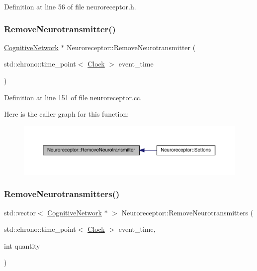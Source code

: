 Definition at line 56 of file neuroreceptor.\+h.

\mbox{\label{class_neuroreceptor_a7e94ac827de7abbac585639edfd4f985}} 
\subsubsection{\texorpdfstring{Remove\+Neurotransmitter()}{RemoveNeurotransmitter()}}
{\footnotesize\ttfamily \hyperlink{class_cognitive_network}{Cognitive\+Network} $\ast$ Neuroreceptor\+::\+Remove\+Neurotransmitter (\begin{DoxyParamCaption}\item[{std\+::chrono\+::time\+\_\+point$<$ \hyperlink{universe_8h_a0ef8d951d1ca5ab3cfaf7ab4c7a6fd80}{Clock} $>$}]{event\+\_\+time }\end{DoxyParamCaption})}



Definition at line 151 of file neuroreceptor.\+cc.

Here is the caller graph for this function\+:\nopagebreak
\begin{figure}[H]
\begin{center}
\leavevmode
\includegraphics[width=350pt]{class_neuroreceptor_a7e94ac827de7abbac585639edfd4f985_icgraph}
\end{center}
\end{figure}
\mbox{\label{class_neuroreceptor_ad760106ce6194ac02959c1882bd0f327}} 
\subsubsection{\texorpdfstring{Remove\+Neurotransmitters()}{RemoveNeurotransmitters()}}
{\footnotesize\ttfamily std\+::vector$<$ \hyperlink{class_cognitive_network}{Cognitive\+Network} $\ast$ $>$ Neuroreceptor\+::\+Remove\+Neurotransmitters (\begin{DoxyParamCaption}\item[{std\+::chrono\+::time\+\_\+point$<$ \hyperlink{universe_8h_a0ef8d951d1ca5ab3cfaf7ab4c7a6fd80}{Clock} $>$}]{event\+\_\+time,  }\item[{int}]{quantity }\end{DoxyParamCaption})}



